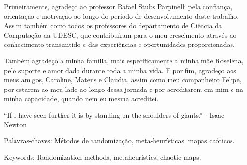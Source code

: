 \documentclass[a4paper,12pt]{monografia}
\begin{document}

\bacharelado {}  
\data{\today}

 



\maketitle

%
  Primeiramente, agradeço ao professor Rafael Stubs Parpinelli pela confiança, orientação e motivação ao longo do período de desenvolvimento deste trabalho. Assim também como todos os professores do departamento de Ciência da Computação da UDESC, que contribuíram para o meu crescimento através do conhecimento transmitido e das experiências e oportunidades proporcionadas.
  
  Também agradeço a minha família, mais especificamente a minha mãe Roselena, pelo suporte e amor dado durante toda a minha vida. E por fim, agradeço aos meus amigos, Caroline, Mateus e Claudia, assim como meu companheiro Felipe, por estarem ao meu lado ao longo dessa jornada e por acreditarem em mim e na minha capacidade, quando nem eu mesma acreditei.

\newpage

\begin{epigrafe}

  ``If I have seen further it is by standing on the shoulders of giants.'' - Isaac Newton

\end{epigrafe}




\noindent Palavras-chaves: Métodos de randomização, meta-heurísticas, mapas caóticos.




\noindent Keywords: Randomization methods, metaheuristics, chaotic maps.

\listoffigures

\listoftables



\tableofcontents

\pagestyle{ruledheader}










\end{document}
